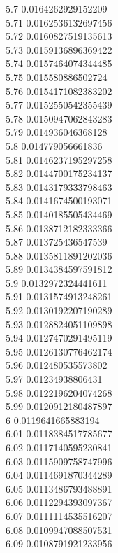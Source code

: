 {5.7	0.0164262929152209\\
5.71	0.0162536132697456\\
5.72	0.0160827519135613\\
5.73	0.0159136896369422\\
5.74	0.0157464074344485\\
5.75	0.015580886502724\\
5.76	0.0154171082383202\\
5.77	0.0152550542355439\\
5.78	0.0150947062843283\\
5.79	0.014936046368128\\
5.8	0.014779056661836\\
5.81	0.0146237195297258\\
5.82	0.0144700175234137\\
5.83	0.0143179333798463\\
5.84	0.0141674500193071\\
5.85	0.0140185505434469\\
5.86	0.0138712182333366\\
5.87	0.013725436547539\\
5.88	0.0135811891202036\\
5.89	0.0134384597591812\\
5.9	0.0132972324441611\\
5.91	0.0131574913248261\\
5.92	0.0130192207190289\\
5.93	0.0128824051109898\\
5.94	0.0127470291495119\\
5.95	0.0126130776462174\\
5.96	0.012480535573802\\
5.97	0.01234938806431\\
5.98	0.0122196204074268\\
5.99	0.0120912180487897\\
6	0.0119641665883194\\
6.01	0.0118384517785677\\
6.02	0.0117140595230841\\
6.03	0.0115909758747996\\
6.04	0.0114691870344289\\
6.05	0.0113486793488891\\
6.06	0.0112294393097367\\
6.07	0.0111114535516207\\
6.08	0.0109947088507531\\
6.09	0.0108791921233956\\
}
